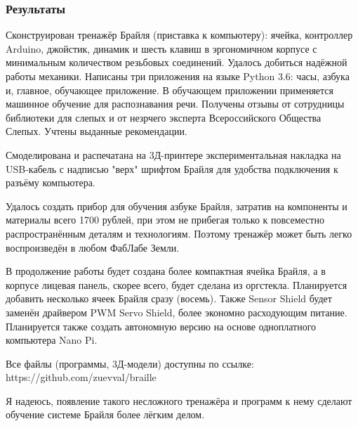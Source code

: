 \documentclass[a4paper,12pt]{article} %
\begin{document}
\subsubsection{Результаты}
Сконструирован тренажёр Брайля (приставка к компьютеру): ячейка, контроллер Arduino, джойстик, динамик и шесть клавиш в эргономичном корпусе с минимальным количеством резьбовых соединений. Удалось добиться надёжной работы механики.
Написаны три приложения на языке Python 3.6: часы, азбука и, главное, обучающее приложение. В обучающем приложении применяется машинное обучение для распознавания речи.
Получены отзывы от сотрудницы библиотеки для слепых и от незрчего эксперта Всероссийского Общества Слепых. Учтены выданные рекомендации.

Смоделирована и распечатана на 3Д-принтере экспериментальная накладка на USB-кабель с надписью "верх" шрифтом Брайля для удобства подключения к разъёму компьютера.

Удалось создать прибор для обучения азбуке Брайля, затратив на компоненты и материалы всего 1700 рублей, при этом не прибегая только к повсеместно распространённым деталям и технологиям. Поэтому тренажёр может быть легко воспроизведён в любом ФабЛабе Земли.

В продолжение работы будет создана более компактная ячейка Брайля, а в корпусе лицевая панель, скорее всего, будет сделана из оргстекла. Планируется добавить несколько ячеек Брайля сразу (восемь). Также Sensor Shield будет заменён драйвером PWM Servo Shield, более экономно расходующим питание.
Планируется также создать автономную версию на основе одноплатного компьютера Nano Pi.

Все файлы (программы, 3Д-модели) доступны по ссылке: https://github.com/zuevval/braille


Я надеюсь, появление такого несложного тренажёра и программ к нему сделают обучение системе Брайля более лёгким делом.
\end{document}
